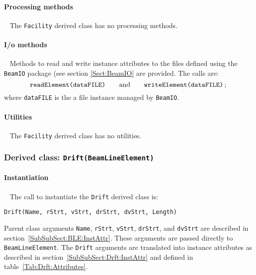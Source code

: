 \paragraph{Processing methods} ~\newline
\noindent
The \texttt{Facility} derived class has no processing methods.

\paragraph{I/o methods} ~\newline
\noindent
Methods to read and write instance attributes to the files defined
using the \texttt{BeamIO} package (see section \ref{Sect:BeamIO} are
provided.
The calls are:
\begin{equation}
  \texttt{readElement(dataFILE)} \quad \quad {\rm and }
      \quad \quad \texttt{writeElement(dataFILE)} \,; \nonumber
\end{equation}
where \texttt{dataFILE} is the a file instance managed by \texttt{BeamIO}.


\paragraph{Utilities} ~\newline
\noindent
The \texttt{Facility} derived class has no utilities.

\FloatBarrier

\subsubsection{Derived class: \texttt{Drift(BeamLineElement)}}

\paragraph{Instantiation} ~\newline
\noindent
The call to instantiate the \texttt{Drift} derived class is:
\begin{center}
  \texttt{Drift(Name, rStrt, vStrt, drStrt, dvStrt, Length)}
\end{center}
Parent class arguments \texttt{Name}, \texttt{rStrt}, \texttt{vStrt},
\texttt{drStrt}, and \texttt{dvStrt} are described in
section~\ref{SubSubSect:BLE:InstAttr}.
These arguments are passed directly to \texttt{BeamLineElement}.
The \texttt{Drift} arguments are translated into instance
attributes as described in section~\ref{SubSubSect:Drft:InstAttr} and
defined in table~\ref{Tab:Drft:Attributes}.

